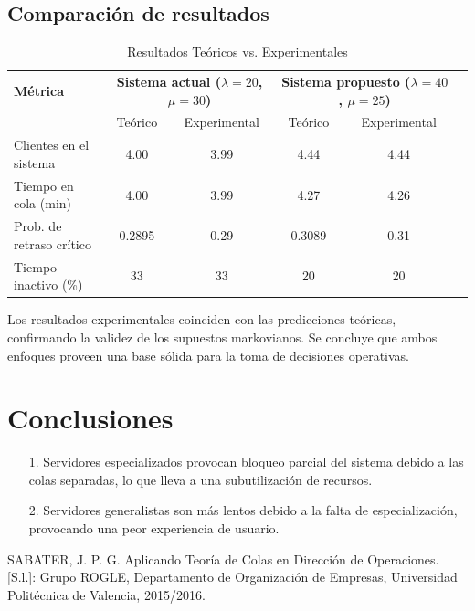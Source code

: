 \documentclass[letterpaper, 12pt]{report}
\begin{document}
\section{Comparación de resultados}
\begin{table}[h]
\centering
\caption{Resultados Teóricos vs. Experimentales}
\begin{tabular}{lccccc}
\toprule
\textbf{Métrica} & \multicolumn{2}{c}{\textbf{Sistema actual ($\lambda = 20$, $\mu = 30$)}} & \multicolumn{2}{c}{\textbf{Sistema propuesto ($\lambda = 40$, $\mu = 25$)}} \\
 & Teórico & Experimental & Teórico & Experimental \\
\midrule
Clientes en el sistema & 4.00 & 3.99 & 4.44 & 4.44 \\
Tiempo en cola (min) & 4.00 & 3.99 & 4.27 & 4.26 \\
Prob. de retraso crítico & 0.2895 & 0.29 & 0.3089 & 0.31 \\
Tiempo inactivo (\%) & 33 & 33 & 20 & 20 \\
\bottomrule
\end{tabular}
\end{table}

Los resultados experimentales coinciden con las predicciones teóricas, confirmando la validez de los supuestos markovianos. 
Se concluye que ambos enfoques proveen una base sólida para la toma de decisiones operativas.

\chapter{Conclusiones}


\begin{itemize}
    \item[1.] Servidores especializados provocan bloqueo parcial del sistema debido a las
    colas separadas, lo que lleva a una subutilización de recursos.
    \item[2.] Servidores generalistas son más lentos debido a la falta de especialización,
    provocando una peor experiencia de usuario.
\end{itemize}


\begin{thebibliography}{9}
     SABATER, J. P. G. Aplicando Teoría de Colas en Dirección de Operaciones. [S.l.]:
    Grupo ROGLE, Departamento de Organización de Empresas, Universidad Politécnica
    de Valencia, 2015/2016.
 
\end{thebibliography}
\end{document}
